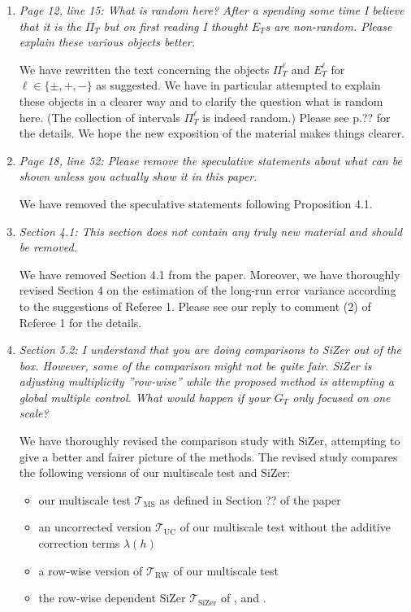 \documentclass[a4paper,12pt]{article}
\begin{document}
\begin{enumerate}[label=(\arabic*),leftmargin=0.8cm]
\item \textit{Page 12, line 15: What is random here? After a spending some time I believe that it is the $\Pi_T$ but on first reading I thought $E_T$s are non-random. Please explain these various objects better.}

We have rewritten the text concerning the objects $\Pi_T^\ell$ and $E_T^\ell$ for $\ell \in \{\pm,+,-\}$ as suggested. We have in particular attempted to explain these objects in a clearer way and to clarify the question what is random here. (The collection of intervals $\Pi_T^\ell$ is indeed random.) Please see p.?? for the details. We hope the new exposition of the material makes things clearer.  


\item \textit{Page 18, line 52: Please remove the speculative statements about what can be shown unless you actually show it in this paper.}

We have removed the speculative statements following Proposition 4.1.


\item \textit{Section 4.1: This section does not contain any truly new material and should be removed.}

We have removed Section 4.1 from the paper. Moreover, we have thoroughly revised Section 4 on the estimation of the long-run error variance according to the suggestions of Referee 1. Please see our reply to comment (2) of Referee 1 for the details. 


\item \textit{Section 5.2: I understand that you are doing comparisons to SiZer out of the box. However, some of the comparison might not be quite fair. SiZer is adjusting multiplicity ”row-wise” while the proposed method is attempting a global multiple control. What would happen if your $G_T$ only focused on one scale?}

We have thoroughly revised the comparison study with SiZer, attempting to give a better and fairer picture of the methods. The revised study compares the following versions of our multiscale test and SiZer: 
\begin{itemize}[leftmargin=0.5cm,itemsep=0cm]

\item our multiscale test $\mathcal{T}_{\text{MS}}$ as defined in Section ?? of the paper 
\item an uncorrected version $\mathcal{T}_{\text{UC}}$ of our multiscale test without the additive correction terms $\lambda(h)$ 
\item a row-wise version of $\mathcal{T}_{\text{RW}}$ of our multiscale test 
\item the row-wise dependent SiZer $\mathcal{T}_{\text{SiZer}}$ of \cite{Rondonotti2004}, \cite{Rondonotti2007} and \cite{ParkHannigKang2009}. 


\end{itemize}
\end{enumerate}
\end{document}
